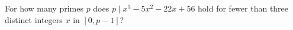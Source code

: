 For how many primes $p$ does $p\mid x^3-5x^2-22x+56$ hold for fewer than three distinct integers $x$ in $[0,p-1]$?
